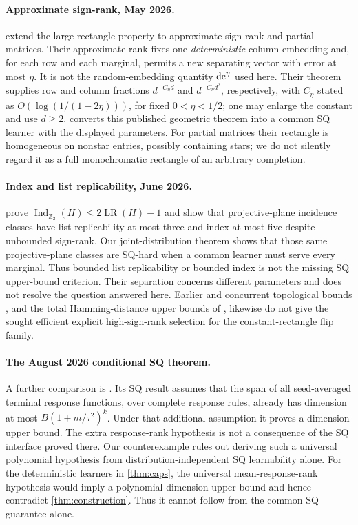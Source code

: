 \paragraph{Approximate sign-rank, May 2026.}
\citet[Theorem~1.3]{BHKR26} extend the large-rectangle property to approximate sign-rank and partial matrices. Their approximate rank fixes one \emph{deterministic} column embedding and, for each row and each marginal, permits a new separating vector with error at most $\eta$. It is not the random-embedding quantity $\operatorname{dc}^\eta$ used here. Their theorem supplies row and column fractions $d^{-C_\eta d}$ and $d^{-C_\eta d^2}$, respectively, with $C_\eta$ stated as $O(\log(1/(1-2\eta)))$, for fixed $0<\eta<1/2$; one may enlarge the constant and use $d\ge2$.  converts this published geometric theorem into a common SQ learner with the displayed parameters. For partial matrices their rectangle is homogeneous on nonstar entries, possibly containing stars; we do not silently regard it as a full monochromatic rectangle of an arbitrary completion.

\paragraph{Index and list replicability, June 2026.}
\citet{BHHLT26} prove $\operatorname{Ind}_{\mathbb Z_2}(H)\le2\operatorname{LR}(H)-1$ and show that projective-plane incidence classes have list replicability at most three and index at most five despite unbounded sign-rank. Our joint-distribution theorem shows that those same projective-plane classes are SQ-hard when a common learner must serve every marginal. Thus bounded list replicability or bounded index is not the missing SQ upper-bound criterion. Their separation concerns different parameters and does not resolve the question answered here. Earlier and concurrent topological bounds \citep{HHM23,FHV26}, and the total Hamming-distance upper bounds of \citet{GHIS25}, likewise do not give the sought efficient explicit high-sign-rank selection for the constant-rectangle flip family.

\paragraph{The August 2026 conditional SQ theorem.}
A further comparison is \citet[Assumption~4.42 and Theorem~4.9]{VALG26}. Its SQ result assumes that the span of all seed-averaged terminal response functions, over complete response rules, already has dimension at most $B(1+m/\tau^2)^k$. Under that additional assumption it proves a dimension upper bound. The extra response-rank hypothesis is not a consequence of the SQ interface proved there. Our counterexample rules out deriving such a universal polynomial hypothesis from distribution-independent SQ learnability alone. For the deterministic learners in \cref{thm:caps}, the universal mean-response-rank hypothesis would imply a polynomial dimension upper bound and hence contradict \cref{thm:construction}. Thus it cannot follow from the common SQ guarantee alone. 

